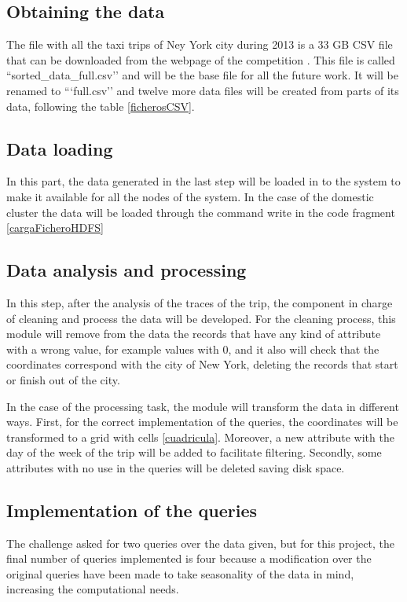 \subsection{Obtaining the data}
The file with all the taxi trips of Ney York city during 2013 is a 33 \gls{GB} \gls{CSV} file that can be downloaded from the webpage of the competition \cite{G
grandChallenge}. This file is called ``sorted\_data\_full.csv’’ and will be the base file for all the future work. It will be renamed to ```full.csv’’ and twelve more data files will be created from parts of its data, following the table \ref{ficherosCSV}.

\subsection{Data loading}
In this part, the data generated in the last step will be loaded in to the system to make it available for all the nodes of the system. In the case of the domestic cluster the data will be loaded through the command write in the code fragment \ref{cargaFicheroHDFS}

\subsection{Data analysis and processing}
In this step, after the analysis of the traces of the trip, the component in charge of cleaning and process the data will be developed. For the cleaning process, this module will remove from the data the records that have any kind of attribute with a wrong value, for example values with 0, and it also will check that the coordinates correspond with the city of New York, deleting the records that start or finish out of the city.

In the case of the processing task, the module will transform the data in different ways. First, for the correct implementation of the queries, the coordinates will be transformed to a grid with cells \ref{cuadricula}. Moreover, a new attribute with the day of the week of the trip will be added to facilitate filtering. Secondly, some attributes with no use in the queries will be deleted saving disk space.

\subsection{Implementation of the queries}
The challenge asked for two queries over the data given, but for this project, the final number of queries implemented is four because a modification over the original queries have been made to take seasonality of the data in mind, increasing the computational needs. 

